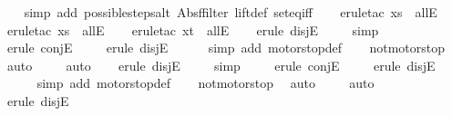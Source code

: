 \begin{isabellebody}
\ \ \isamarkupfalse%
\ {\isacharparenleft}simp\ add{\isacharcolon}\ possible{\isacharunderscore}steps{\isacharunderscore}alt{}\ Abs{\isacharunderscore}ffilter\ lift{\isacharunderscore}def\ set{\isacharunderscore}eq{\isacharunderscore}iff{\isacharparenright}\isanewline
\ \ \isamarkupfalse%
\ {\isacharparenleft}erule{\isacharunderscore}tac\ x{\isacharequal}s\ \ allE{\isacharparenright}\isanewline
\ \ \isamarkupfalse%
\ {\isacharparenleft}erule{\isacharunderscore}tac\ x{\isacharequal}s{\isacharprime}\ \ allE{\isacharparenright}\isanewline
\ \ \isamarkupfalse%
\ {\isacharparenleft}erule{\isacharunderscore}tac\ x{\isacharequal}t\ \ allE{\isacharparenright}\isanewline
\ \ \isamarkupfalse%
\ {\isacharparenleft}erule\ disjE{\isacharparenright}\isanewline
\ \ \ \isamarkupfalse%
\ simp\isanewline
\ \ \ \isamarkupfalse%
\ {\isacharparenleft}erule\ conjE{\isacharparenright}\isanewline
\ \ \ \isamarkupfalse%
\ {\isacharparenleft}erule\ disjE{\isacharparenright}\isanewline
\ \ \ \ \isamarkupfalse%
\ {\isacharparenleft}simp\ add{\isacharcolon}\ motorstop{}{\isacharunderscore}def{\isacharparenright}\isanewline
\ \ \isamarkupfalse%
\ not{\isacharunderscore}motorstop\ \isamarkupfalse%
\ auto{\isacharbrackleft}{}{\isacharbrackright}\isanewline
\ \ \ \isamarkupfalse%
\ auto{\isacharbrackleft}{}{\isacharbrackright}\isanewline
\ \ \isamarkupfalse%
\ {\isacharparenleft}erule\ disjE{\isacharparenright}\isanewline
\ \ \ \isamarkupfalse%
\ simp\isanewline
\ \ \ \isamarkupfalse%
\ {\isacharparenleft}erule\ conjE{\isacharparenright}\isanewline
\ \ \ \isamarkupfalse%
\ {\isacharparenleft}erule\ disjE{\isacharparenright}\isanewline
\ \ \ \ \isamarkupfalse%
\ {\isacharparenleft}simp\ add{\isacharcolon}\ motorstop{}{\isacharunderscore}def{\isacharparenright}\isanewline
\ \ \isamarkupfalse%
\ not{\isacharunderscore}motorstop\ \isamarkupfalse%
\ auto{\isacharbrackleft}{}{\isacharbrackright}\isanewline
\ \ \ \isamarkupfalse%
\ auto{\isacharbrackleft}{}{\isacharbrackright}\isanewline
\ \ \isamarkupfalse%
\ {\isacharparenleft}erule\ disjE{\isacharparenright}\isanewline
\ \ \ \isamarkupfalse%

\end{isabellebody}
